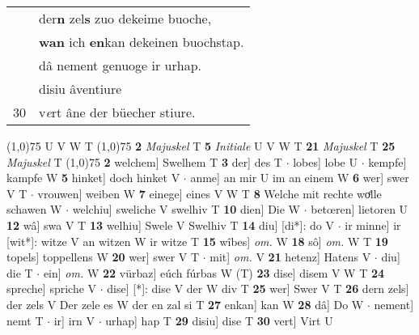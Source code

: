 \documentclass[8pt,a4paper,notitlepage]{article}
\begin{document}
\begin{table}[ht]
\begin{minipage}[t]{0.5\linewidth}
\begin{tabular}{rl}
 & der\textbf{n} zel\textbf{s} zuo dekeime buoche,\\ 
 & \textbf{wan} ich \textbf{en}kan dekeinen buochstap.\\ 
 & dâ nement genuoge ir urhap.\\ 
 & disiu âventiure\\ 
30 & v\textit{e}rt âne der büecher stiure.\\ 
\end{tabular}
\scriptsize
\line(1,0){75} \newline
U V W T \newline
\line(1,0){75} \newline
\textbf{2} \textit{Majuskel} T  \textbf{5} \textit{Initiale} U V W T  \textbf{21} \textit{Majuskel} T  \textbf{25} \textit{Majuskel} T  \newline
\line(1,0){75} \newline
\textbf{2} welchem] Swelhem T \textbf{3} der] des T  $\cdot$ lobes] lobe U  $\cdot$ kempfe] kampfe W \textbf{5} hinket] doch hinket V  $\cdot$ anme] an mir U im an einem W \textbf{6} wer] swer V T  $\cdot$ vrouwen] weiben W \textbf{7} einege] eines V W T \textbf{8} Welche mit rechte woͤlle schawen W  $\cdot$ welchiu] sweliche V swelhiv T \textbf{10} dien] Die W  $\cdot$ betœren] lietoren U \textbf{12} wâ] swa V T \textbf{13} welhiu] Swele V Swelhiv T \textbf{14} diu] [di*]: do V  $\cdot$ ir minne] ir [wit*]: witze V an witzen W ir witze T \textbf{15} wîbes] \textit{om.} W \textbf{18} sô] \textit{om.} W T \textbf{19} topels] toppellens W \textbf{20} wer] swer V T  $\cdot$ mit] \textit{om.} V \textbf{21} hetenz] Hatens V  $\cdot$ diu] die T  $\cdot$ ein] \textit{om.} W \textbf{22} vürbaz] eúch fúrbas W (T) \textbf{23} dise] disem V W T \textbf{24} spreche] spriche V  $\cdot$ dise] [*]: dise V der W div T \textbf{25} wer] Swer V T \textbf{26} dern zels] der zels V Der zele es W der en zal si T \textbf{27} enkan] kan W \textbf{28} dâ] Do W  $\cdot$ nement] nemt T  $\cdot$ ir] irn V  $\cdot$ urhap] hap T \textbf{29} disiu] dise T \textbf{30} vert] Virt U \newline
\end{minipage}
\end{table}
\end{document}
